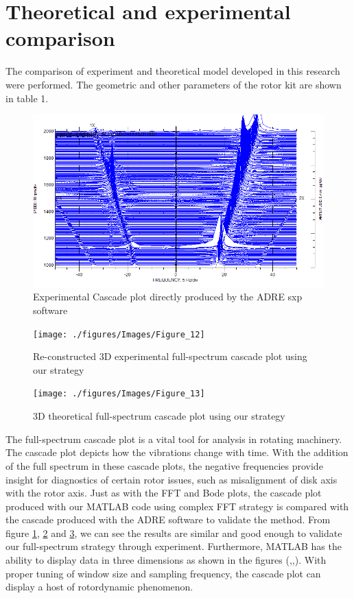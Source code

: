 	\section{Theoretical and experimental comparison}
		The comparison of experiment and theoretical model developed in this research were performed. The geometric and other parameters of the rotor kit are shown in table 1.\par 
		\begin{figure}[H]	
			\centering
			\includegraphics[width=.75\linewidth]{./figures/Images/Figure_11}
			\caption{Experimental Cascade plot directly produced by the ADRE sxp software}
			\label{fig:Figure_11}
		\end{figure}
		\begin{figure}[H]	
			\centering
			\texttt{[image: ./figures/Images/Figure\_12]}
			\caption{Re-constructed 3D experimental full-spectrum cascade plot using our strategy}
			\label{fig:Figure_12}
		\end{figure}
		\begin{figure}[H]	
			\centering
			\texttt{[image: ./figures/Images/Figure\_13]}
			\caption{3D theoretical full-spectrum cascade plot using our strategy}
			\label{fig:Figure_13}
		\end{figure}
		The full-spectrum cascade plot is a vital tool for analysis in rotating machinery. The cascade plot depicts how the vibrations change with time. With the addition of the full spectrum in these cascade plots, the negative frequencies provide insight for diagnostics of certain rotor issues, such as misalignment of disk axis with the rotor axis. Just as with the FFT and Bode plots, the cascade plot produced with our MATLAB code using complex FFT strategy is compared with the cascade produced with the ADRE software to validate the method. From figure \ref{fig:Figure_11}, \ref{fig:Figure_12} and \ref{fig:Figure_13}, we can see the results are similar and good enough to validate our full-spectrum strategy through experiment. Furthermore, MATLAB has the ability to display data in three dimensions as shown in the figures (\cite{Southwick},\cite{Southwick 94},\cite{Dimarogonas}). With proper tuning of window size and sampling frequency, the cascade plot can display a host of rotordynamic phenomenon.\par 
